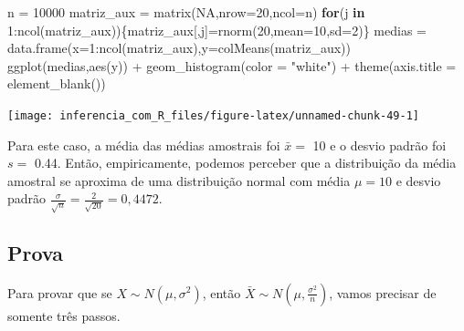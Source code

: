 \documentclass[
]{book}
\newenvironment{Shaded}{\begin{snugshade}}{\end{snugshade}}
\newcommand{\AttributeTok}[1]{\textcolor[rgb]{0.77,0.63,0.00}{#1}}
\newcommand{\ConstantTok}[1]{\textcolor[rgb]{0.00,0.00,0.00}{#1}}
\newcommand{\ControlFlowTok}[1]{\textcolor[rgb]{0.13,0.29,0.53}{\textbf{#1}}}
\newcommand{\DecValTok}[1]{\textcolor[rgb]{0.00,0.00,0.81}{#1}}
\newcommand{\FunctionTok}[1]{\textcolor[rgb]{0.00,0.00,0.00}{#1}}
\newcommand{\NormalTok}[1]{#1}
\newcommand{\OtherTok}[1]{\textcolor[rgb]{0.56,0.35,0.01}{#1}}
\newcommand{\SpecialCharTok}[1]{\textcolor[rgb]{0.00,0.00,0.00}{#1}}
\newcommand{\StringTok}[1]{\textcolor[rgb]{0.31,0.60,0.02}{#1}}
\begin{document}
\begin{Shaded}
\begin{Highlighting}[]
\NormalTok{n }\OtherTok{=} \DecValTok{10000}
\NormalTok{matriz\_aux }\OtherTok{=} \FunctionTok{matrix}\NormalTok{(}\ConstantTok{NA}\NormalTok{,}\AttributeTok{nrow=}\DecValTok{20}\NormalTok{,}\AttributeTok{ncol=}\NormalTok{n)}
\ControlFlowTok{for}\NormalTok{(j }\ControlFlowTok{in} \DecValTok{1}\SpecialCharTok{:}\FunctionTok{ncol}\NormalTok{(matriz\_aux))\{matriz\_aux[,j]}\OtherTok{=}\FunctionTok{rnorm}\NormalTok{(}\DecValTok{20}\NormalTok{,}\AttributeTok{mean=}\DecValTok{10}\NormalTok{,}\AttributeTok{sd=}\DecValTok{2}\NormalTok{)\}}
\NormalTok{medias }\OtherTok{=} \FunctionTok{data.frame}\NormalTok{(}\AttributeTok{x=}\DecValTok{1}\SpecialCharTok{:}\FunctionTok{ncol}\NormalTok{(matriz\_aux),}\AttributeTok{y=}\FunctionTok{colMeans}\NormalTok{(matriz\_aux))}
\FunctionTok{ggplot}\NormalTok{(medias,}\FunctionTok{aes}\NormalTok{(y)) }\SpecialCharTok{+}
  \FunctionTok{geom\_histogram}\NormalTok{(}\AttributeTok{color =} \StringTok{"white"}\NormalTok{) }\SpecialCharTok{+}
  \FunctionTok{theme}\NormalTok{(}\AttributeTok{axis.title =} \FunctionTok{element\_blank}\NormalTok{())}
\end{Highlighting}
\end{Shaded}

\begin{center}\texttt{[image: inferencia\_com\_R\_files/figure-latex/unnamed-chunk-49-1]} \end{center}

Para este caso, a média das médias amostrais foi \(\bar x=\) 10 e o desvio padrão foi \(s =\) 0.44. Então, empiricamente, podemos perceber que a distribuição da média amostral se aproxima de uma distribuição normal com média \(\mu=10\) e desvio padrão \(\frac{\sigma}{\sqrt{n}}=\frac{2}{\sqrt{20}}=0,4472\).

\hypertarget{prova}{%
\subsection{Prova}\label{prova}}

Para provar que se \(X\sim N(\mu,\sigma^2)\), então \(\bar X \sim N(\mu,\frac{\sigma^2}{n})\), vamos precisar de somente três passos.
\end{document}
